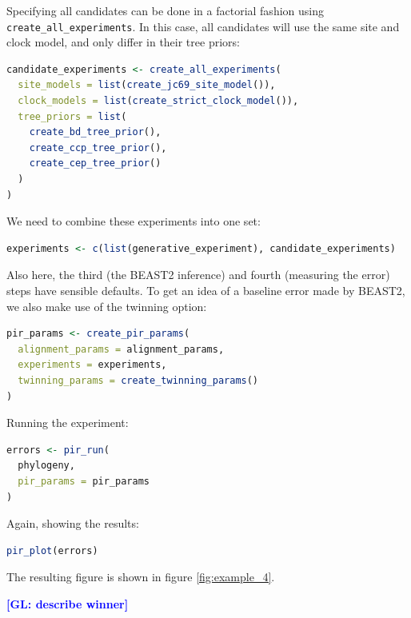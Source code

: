 \documentclass{article}
\newcommand{\giovanni}[1]{\textcolor{blue}{\textbf{[GL: #1]}}}
\begin{document}
Specifying all candidates can be done in a factorial fashion using 
\verb;create_all_experiments;. In this case, all candidates will use the
same site and clock model, and only differ in their tree priors:

\begin{lstlisting}[language=R, floatplacement=H, frame=single]
candidate_experiments <- create_all_experiments(
  site_models = list(create_jc69_site_model()),
  clock_models = list(create_strict_clock_model()),
  tree_priors = list(
    create_bd_tree_prior(), 
    create_ccp_tree_prior(), 
    create_cep_tree_prior()
  )
)
\end{lstlisting}

We need to combine these experiments into one set:

\begin{lstlisting}[language=R, floatplacement=H, frame=single]
experiments <- c(list(generative_experiment), candidate_experiments)
\end{lstlisting}

Also here, the third (the BEAST2 inference) and fourth (measuring the error)
steps have sensible defaults. To get an idea of a baseline error made by
BEAST2, we also make use of the twinning option:

\begin{lstlisting}[language=R, floatplacement=H, frame=single]
pir_params <- create_pir_params(
  alignment_params = alignment_params,
  experiments = experiments,
  twinning_params = create_twinning_params()
)
\end{lstlisting}

Running the experiment:

\begin{lstlisting}[language=R, floatplacement=H, frame=single]
errors <- pir_run(
  phylogeny,
  pir_params = pir_params
)
\end{lstlisting}

Again, showing the results:

\begin{lstlisting}[language=R, floatplacement=H, frame=single]
pir_plot(errors)
\end{lstlisting}

The resulting figure is shown in figure \ref{fig:example_4}.

\giovanni{describe winner}
\end{document}
